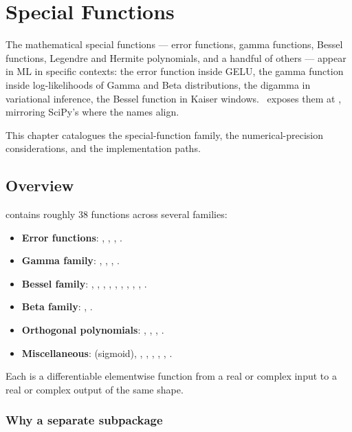 \chapter{Special Functions}
\label{ch:special_functions}

The mathematical special functions --- error functions, gamma
functions, Bessel functions, Legendre and Hermite polynomials,
and a handful of others --- appear in ML in specific contexts:
the error function inside GELU, the gamma function inside
log-likelihoods of Gamma and Beta distributions, the digamma in
variational inference, the Bessel function in Kaiser windows.
\Lucid\ exposes them at , mirroring SciPy's
 where the names align.

This chapter catalogues the special-function family, the
numerical-precision considerations, and the implementation paths.

\section{Overview}
\label{sec:special_functions:overview}

 contains roughly 38 functions across
several families:

\begin{itemize}
  \item \textbf{Error functions}: , ,
    , .
  \item \textbf{Gamma family}: , ,
    , .
  \item \textbf{Bessel family}: , ,
    , , , , ,
    , , .
  \item \textbf{Beta family}: , .
  \item \textbf{Orthogonal polynomials}: ,
    , , .
  \item \textbf{Miscellaneous}:  (sigmoid), ,
    , , , ,
    .
\end{itemize}

Each is a differentiable elementwise function from a real or
complex input to a real or complex output of the same shape.

\subsection{Why a separate subpackage}
\label{ssec:special_functions:why_separate}

